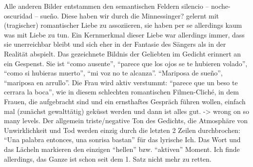 
Alle anderen Bilder entstammen den semantischen Feldern silencio -- noche-oscuridad -- sueño.
Diese haben wir durch die Minnessinger? gelernt mit (tragischer) romantischer Liebe zu assoziieren, sie haben per se allerdings kaum was mit Liebe zu tun.
Ein Kernmerkmal dieser Liebe war allerdings immer, dass sie unerreichbar bleibt und sich eher in der Fantasie des Sängers als in der Realität abspielt. %
Das gezeichnete Bildnis der Geliebten im Gedicht erinnert an ein Gespenst.
Sie ist ``como ausente'', ``parece que los ojos se te hubieren volado'', ``como si hubieras muerto'', ``mi voz no te alcanza''.
``Mariposa de sueño'', ``mariposa en arrullo''.
Die Frau wird aktiv verstummt: ``parece que un beso te cerrara la boca'', wie in diesem schlechten romantischen Filmen-Cliché, in dem Frauen, die aufgebracht sind und ein ernsthaftes Gespräch führen wollen, einfach mal (zunächst gewalttätig) geküsst werden und dann ist alles gut. -> wrong on so many levels.
Der allgemein triste/negative Ton des Gedichts, die Atmosphäre von Unwirklichkeit und Tod werden einzig durch die letzten 2 Zeilen durchbrochen: ``Una palabra entonces, una sonrisa bastan'' für das lyrische Ich.
Das Wort und das Lächeln markieren den einzigen ``hellen'' bzw. ``aktiven'' Moment.
Ich finde allerdings, das Ganze ist schon seit dem 1. Satz nicht mehr zu retten.

